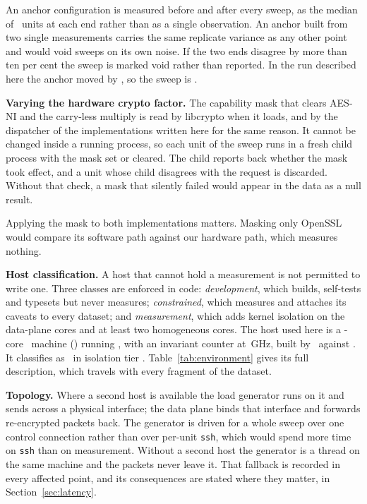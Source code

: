 An anchor configuration is measured before and after every sweep, as the median
of \ctlAnchorReplicates\ units at each end rather than as a single observation.
An anchor built from two single measurements carries the same replicate variance
as any other point and would void sweeps on its own noise. If the two ends
disagree by more than ten per cent the sweep is marked void rather than
reported. In the run described here the anchor moved by \anchorDrift, so the
sweep is \anchorVerdict.

\noindent\textbf{Varying the hardware crypto factor.}
The capability mask that clears AES-NI and the carry-less multiply is read by
libcrypto when it loads, and by the dispatcher of the implementations written
here for the same reason. It cannot be changed inside a running process, so each
unit of the sweep runs in a fresh child process with the mask set or cleared.
The child reports back whether the mask took effect, and a unit whose child
disagrees with the request is discarded. Without that check, a mask that
silently failed would appear in the data as a null result.

Applying the mask to both implementations matters. Masking only OpenSSL would
compare its software path against our hardware path, which measures nothing.

\begin{table}[t]
\caption{The measurement host, as recorded with every dataset fragment.}
\label{tab:environment}
\centering\footnotesize

\end{table}

\noindent\textbf{Host classification.}
A host that cannot hold a measurement is not permitted to write one. Three
classes are enforced in code: \emph{development}, which builds, self-tests and
typesets but never measures; \emph{constrained}, which measures and attaches its
caveats to every dataset; and \emph{measurement}, which adds kernel isolation on
the data-plane cores and at least two homogeneous cores. The host used here is a
\envCores-core \envArch\ machine (\envCPU) running \envOS, with an invariant
counter at \envTSCGHz\,GHz, built by \envCompiler\ against \envOpenSSL. It
classifies as \envHostClass\ in isolation tier \envIsolationTier.
Table~\ref{tab:environment} gives its full description, which travels with every
fragment of the dataset.

\noindent\textbf{Topology.}
Where a second host is available the load generator runs on it and sends across
a physical interface; the data plane binds that interface and forwards
re-encrypted packets back. The generator is driven for a whole sweep over one
control connection rather than over per-unit \texttt{ssh}, which would spend
more time on \texttt{ssh} than on measurement. Without a second host the
generator is a thread on the same machine and the packets never leave it. That
fallback is recorded in every affected point, and its consequences are stated
where they matter, in Section~\ref{sec:latency}.
